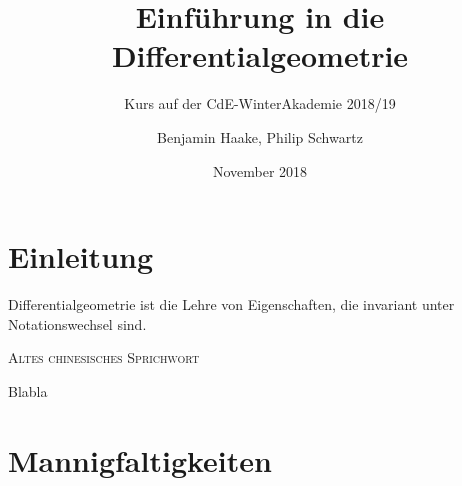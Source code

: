 \documentclass[a4paper]{scrreprt}
\title{Einführung in die Differentialgeometrie}
\subtitle{Kurs auf der CdE-WinterAkademie 2018/19}
\author{Benjamin Haake, Philip Schwartz}
\date{November 2018}
\numberwithin{equation}{chapter}
\theoremstyle{plain}
\begin{document}
\maketitle

\setcounter{chapter}{-1}
\chapter{Einleitung}
\epigraph{Differentialgeometrie ist die Lehre von Eigenschaften, die invariant unter Notationswechsel sind.}{\textsc{Altes chinesisches Sprichwort}}

Blabla


\chapter{Mannigfaltigkeiten}
\end{document}
